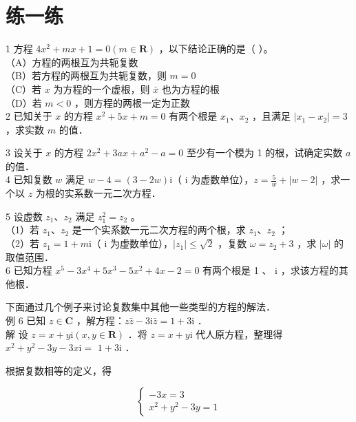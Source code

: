 \documentclass[10pt]{article}
\begin{document}
\section*{练一练}
1 方程 \(4 x^{2}+m x+1=0(m \in \mathbf{R})\) ，以下结论正确的是（ ）。\\
（A）方程的两根互为共轭复数\\
（B）若方程的两根互为共轭复数，则 \(m=0\)\\
（C）若 \(x\) 为方程的一个虚根，则 \(\bar{x}\) 也为方程的根\\
（D）若 \(m<0\) ，则方程的两根一定为正数\\
2 已知关于 \(x\) 的方程 \(x^{2}+5 x+m=0\) 有两个根是 \(x_{1} 、 x_{2}\) ，且满足 \(\left|x_{1}-x_{2}\right|=3\) ，求实数 \(m\) 的值．

3 设关于 \(x\) 的方程 \(2 x^{2}+3 a x+a^{2}-a=0\) 至少有一个模为 1 的根，试确定实数 \(a\) 的值．\\
4 已知复数 \(w\) 满足 \(w-4=(3-2 w) \mathrm{i}\)（ i 为虚数单位），\(z=\frac{5}{w}+|w-2|\) ，求一个以 \(z\) 为根的实系数一元二次方程．

5 设虚数 \(z_{1} 、 z_{2}\) 满足 \(z_{1}^{2}=z_{2}\) 。\\
（1）若 \(z_{1} 、 z_{2}\) 是一个实系数一元二次方程的两个根，求 \(z_{1} 、 z_{2}\) ；\\
（2）若 \(z_{1}=1+m \mathrm{i}\)（ i 为虚数单位），\(\left|z_{1}\right| \leqslant \sqrt{2}\) ，复数 \(\omega=z_{2}+3\) ，求 \(|\omega|\) 的取值范围．\\
6 已知方程 \(x^{5}-3 x^{4}+5 x^{3}-5 x^{2}+4 x-2=0\) 有两个根是 1 、 i ，求该方程的其他根．

下面通过几个例子来讨论复数集中其他一些类型的方程的解法．\\
例 6 已知 \(z \in \mathbf{C}\) ，解方程：\(z \bar{z}-3 \mathrm{i} \bar{z}=1+3 \mathrm{i}\) ．\\
解 设 \(z=x+y \mathrm{i}(x, y \in \mathbf{R})\) ．将 \(z=x+y \mathrm{i}\) 代人原方程，整理得 \(x^{2}+y^{2}-3 y-3 x \mathrm{i}=\) \(1+3 \mathrm{i}\) ．

根据复数相等的定义，得

\[
\left\{\begin{array}{l}
-3 x=3 \\
x^{2}+y^{2}-3 y=1
\end{array}\right.
\]
\end{document}
